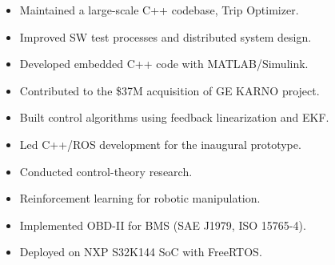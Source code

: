 \documentclass[10pt,a4paper,ragged2e,withhyper]{altacv}
\begin{document}
\begin{paracol}{2}

    \begin{itemize}
        \item Maintained a large-scale C++ codebase, Trip Optimizer\textsuperscript{\textregistered}.
        \item Improved SW test processes and distributed system design.
    \end{itemize}

    \divider

    \begin{itemize}
        \item Developed embedded C++ code with MATLAB/Simulink.
        \item Contributed to the \$37M acquisition of GE KARNO\textsuperscript{\textregistered} project.
    \end{itemize}

    \divider

    \begin{itemize}
        \item Built control algorithms using feedback linearization and EKF.
        \item Led C++/ROS development for the inaugural prototype.
    \end{itemize}

    \divider

    \begin{itemize}
        \item Conducted control-theory research.
        \item Reinforcement learning for robotic manipulation.
    \end{itemize}

    \divider

    \begin{itemize}
        \item Implemented OBD-II for BMS (SAE J1979, ISO 15765-4).
        \item Deployed on NXP S32K144 SoC with FreeRTOS.
    \end{itemize}


\end{paracol}
\end{document}
